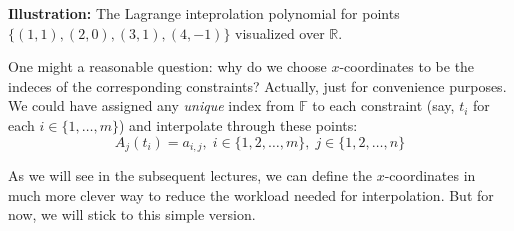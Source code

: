 \documentclass[../lecture-notes-148x210.tex]{subfiles}
\begin{document}
\begin{example}
    \begin{center}

        \textbf{Illustration:} The Lagrange inteprolation polynomial for points $\{(1,1), (2,0), (3,1), (4,-1)\}$ visualized over $\mathbb{R}$.
    \end{center}
\end{example}

\begin{remark}
    One might a reasonable question: why do we choose $x$-coordinates to be the indeces of the corresponding constraints? 
    Actually, just for convenience purposes. We could have assigned any \textit{unique} index from $\mathbb{F}$ to each 
    constraint (say, $t_i$ for each $i \in \{1,\dots,m\}$) and interpolate through these points:
    \begin{equation*}
        A_j(t_i) = a_{i,j}, \; i \in \{1,2,\dots,m\}, \; j \in \{1,2,\dots,n\}
    \end{equation*}

    As we will see in the subsequent lectures, we can define the $x$-coordinates in much more clever way to reduce the workload
    needed for interpolation. But for now, we will stick to this simple version.
\end{remark}
\end{document}
